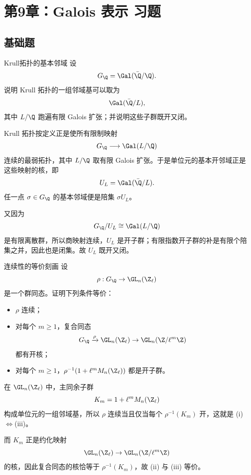 \chapter{第9章：Galois 表示 习题}
\difficultykey

\section{基础题 \easy}

\begin{problem}{Krull拓扑的基本邻域}
\easy
设
\[
G_\Q=\Gal(\bar\Q/\Q).
\]
说明 Krull 拓扑的一组邻域基可以取为
\[
\Gal(\bar\Q/L),
\]
其中 $L/\Q$ 跑遍有限 Galois 扩张；并说明这些子群既开又闭。
\end{problem}
\begin{solution}
Krull 拓扑按定义正是使所有限制映射
\[
G_\Q\longrightarrow \Gal(L/\Q)
\]
连续的最弱拓扑，其中 $L/\Q$ 取有限 Galois 扩张。于是单位元的基本开邻域正是这些映射的核，即
\[
U_L=\Gal(\bar\Q/L).
\]
任一点 $\sigma\in G_\Q$ 的基本邻域便是陪集 $\sigma U_L$。

又因为
\[
G_\Q/U_L\cong \Gal(L/\Q)
\]
是有限离散群，所以商映射连续，$U_L$ 是开子群；有限指数开子群的补是有限个陪集之并，因此也是闭集。故 $U_L$ 既开又闭。
\end{solution}

\begin{problem}{连续性的等价刻画}
\easy
设
\[
\rho:G_\Q\to \GL_n(\Z_\ell)
\]
是一个群同态。证明下列条件等价：
\begin{itemize}
\item[(i)] $\rho$ 连续；
\item[(ii)] 对每个 $m\ge1$，复合同态
\[
G_\Q\xrightarrow{\rho}\GL_n(\Z_\ell)\to \GL_n(\Z/\ell^m\Z)
\]
都有开核；
\item[(iii)] 对每个 $m\ge1$，$\rho^{-1}(1+\ell^mM_n(\Z_\ell))$ 都是开子群。
\end{itemize}
\end{problem}
\begin{solution}
在 $\GL_n(\Z_\ell)$ 中，主同余子群
\[
K_m=1+\ell^mM_n(\Z_\ell)
\]
构成单位元的一组邻域基，所以 $\rho$ 连续当且仅当每个 $\rho^{-1}(K_m)$ 开，这就是 (i)$\Leftrightarrow$(iii)。

而 $K_m$ 正是约化映射
\[
\GL_n(\Z_\ell)\to \GL_n(\Z/\ell^m\Z)
\]
的核，因此复合同态的核恰等于 $\rho^{-1}(K_m)$，故 (ii) 与 (iii) 等价。
\end{solution}


